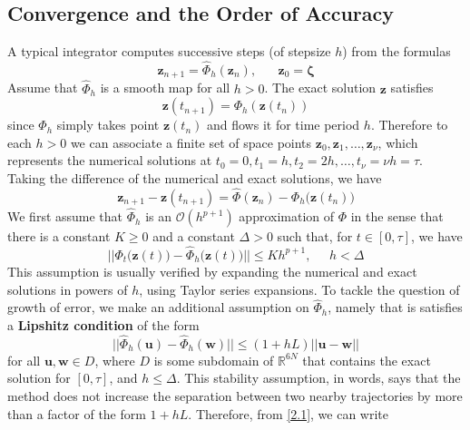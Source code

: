 \documentclass{article}
\begin{document}
  \subsection{Convergence and the Order of Accuracy}

    A typical integrator computes successive steps (of stepsize $h$) from the formulas 
    \begin{equation}
      \mathbf{z}_{n+1} = \hat{\Phi}_h (\mathbf{z}_n), \;\;\;\;\;\; \mathbf{z}_0 = \boldsymbol{\zeta}
    \end{equation}
    Assume that $\hat{\Phi}_h$ is a smooth map for all $h > 0$. The exact solution $\mathbf{z}$ satisfies
    \begin{equation}
      \mathbf{z} (t_{n+1}) = \Phi_h (\mathbf{z}(t_n))
    \end{equation}
    since $\Phi_h$ simply takes point $\mathbf{z}(t_n)$ and flows it for time period $h$. Therefore to each $h > 0$ we can associate a finite set of space points $\mathbf{z}_0, \mathbf{z}_1, \ldots, \mathbf{z}_\nu$, which represents the numerical solutions at $t_0 = 0, t_1 = h, t_2 = 2h, \ldots, t_\nu = \nu h = \tau$. Taking the difference of the numerical and exact solutions, we have 
    \begin{equation}
      \mathbf{z}_{n+1} - \mathbf{z}(t_{n+1}) = \hat{\Phi}(\mathbf{z}_n) - \Phi_h \big(\mathbf{z}(t_n) \big) \label{2.1} \tag{2.1}
    \end{equation}
    We first assume that $\hat{\Phi}_h$ is an $\mathcal{O}(h^{p+1})$ approximation of $\Phi$ in the sense that there is a constant $K \geq 0$ and a constant $\Delta > 0$ such that, for $t \in [0, \tau]$, we have 
    \begin{equation}
      || \Phi_t\big(\mathbf{z}(t)\big) - \hat{\Phi}_h \big(\mathbf{z}(t)\big) || \leq K h^{p+1}, \;\;\;\;\; h < \Delta
    \end{equation}
    This assumption is usually verified by expanding the numerical and exact solutions in powers of $h$, using Taylor series expansions. To tackle the question of growth of error, we make an additional assumption on $\hat{\Phi}_h$, namely that is satisfies a \textbf{Lipshitz condition} of the form 
    \begin{equation}
      ||\hat{\Phi}_h (\mathbf{u}) - \hat{\Phi}_h (\mathbf{w})|| \leq (1 + h L) || \mathbf{u} - \mathbf{w}||
    \end{equation}
    for all $\mathbf{u}, \mathbf{w} \in D$, where $D$ is some subdomain of $\mathbb{R}^{6N}$ that contains the exact solution for $[0, \tau]$, and $h \leq \Delta$. This stability assumption, in words, says that the method does not increase the separation between two nearby trajectories by more than a factor of the form $1 + hL$. Therefore, from \eqref{2.1}, we can write 
\end{document}

